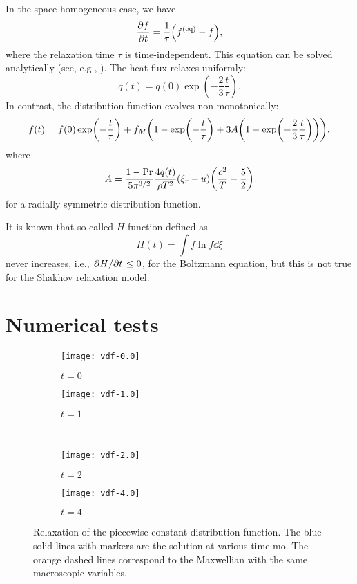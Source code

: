 \documentclass{article}
\newcommand{\equil}[1]{#1^\mathrm{(eq)}}
\begin{document}
In the space-homogeneous case, we have
\begin{equation}\label{eq:relax}
    \pdv{f}{t} = \frac1\tau\qty(\equil{f} - f),
\end{equation}
where the relaxation time $\tau$ is time-independent.
This equation can be solved analytically (see, e.g., \cite{titarev2004numerical}).
The heat flux relaxes uniformly:
\begin{equation}\label{eq:relax:q}
    q(t) = q(0)\exp(-\frac23\frac{t}\tau).
\end{equation}
In contrast, the distribution function evolves non-monotonically:
\begin{equation}\label{eq:relax:f}
    f(t) = f(0)\exp(-\frac{t}\tau) + f_M\qty(1 - \exp(-\frac{t}\tau) + 3A\qty(1-\exp(-\frac23\frac{t}\tau))),
\end{equation}
where
\begin{equation}\label{eq:relax:A}
    A = \frac{1-\Pr}{5\pi^{3/2}}\frac{4q(t)}{\rho T^2}(\xi_r - u)\qty(\frac{c^2}{T} - \frac52)
\end{equation}
for a radially symmetric distribution function.

It is known that so called $H$-function defined as
\begin{equation}\label{eq:relax:H}
    H(t) = \int f\ln{f}\dd\xi
\end{equation}
never increases, i.e., $\pdv*{H}{t}\leq0$, for the Boltzmann equation,
but this is not true for the Shakhov relaxation model.

\section{Numerical tests}

\begin{figure}
    \centering
    \begin{subfigure}[b]{0.5\textwidth}
        \texttt{[image: vdf-0.0]}
        \caption{$t=0$}
        \label{fig:piecewise:0}
    \end{subfigure}%
    \begin{subfigure}[b]{0.5\textwidth}
        \texttt{[image: vdf-1.0]}
        \caption{$t=1$}
        \label{fig:piecewise:1}
    \end{subfigure}\\
    \begin{subfigure}[b]{0.5\textwidth}
        \texttt{[image: vdf-2.0]}
        \caption{$t=2$}
        \label{fig:piecewise:2}
    \end{subfigure}%
    \begin{subfigure}[b]{0.5\textwidth}
        \texttt{[image: vdf-4.0]}
        \caption{$t=4$}
        \label{fig:piecewise:4}
    \end{subfigure}
    \caption{
        Relaxation of the piecewise-constant distribution function.
        The blue solid lines with markers are the solution at various time mo.
        The orange dashed lines correspond to the Maxwellian with the same macroscopic variables. 
    }\label{fig:piecewise}
\end{figure}
\end{document}
